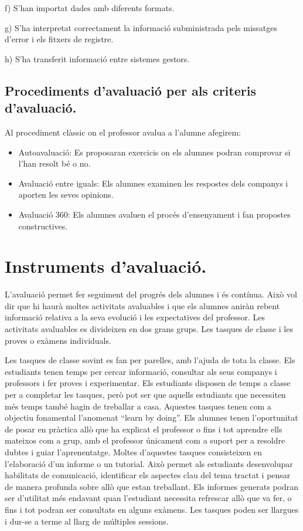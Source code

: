 \documentclass[catalan, a4paper, 12pt, titlepage]{article}
\begin{document}
f) S'han importat dades amb diferents formats.

g) S'ha interpretat correctament la informació subministrada pels missatges d'error i els fitxers de registre.

h) S'ha transferit informació entre sistemes gestors.

\subsection{Procediments d'avaluació per als criteris d'avaluació.}
\label{subsec:procediments}

Al procediment clàssic on el professor avalua a l'alumne afegirem:

\begin{itemize}
	\item Autoavaluació: Es proposaran exercicis on els alumnes podran comprovar si l'han resolt bé o no.
	\item Avaluació entre iguals: Els alumnes examinen les respostes dels companys i aporten les seves opinions.
	\item Avaluació 360: Els alumnes avaluen el procés d'ensenyament i fan propostes constructives.
\end{itemize}

\section{Instruments d'avaluació.}
\label{sec:instruments}

L'avaluació permet fer seguiment del progrés dels alumnes i és contínua.
Això vol dir que hi haurà moltes activitats avaluables i que els alumnes aniràn rebent informació relativa a la seva evolució i les expectatives del professor.
Les activitats avaluables es divideixen en dos grans grups. 
Les tasques de classe i les proves o exàmens individuals.

Les tasques de classe sovint es fan per parelles, amb l'ajuda de tota la classe.
Els estudiants tenen temps per cercar informació, consultar als seus companys i professors i fer proves i experimentar. 
Els estudiants disposen de temps a classe per a completar les tasques, però pot ser que aquells estudiants que necessiten més temps també hagin de treballar a casa.
Aquestes tasques tenen com a objectiu fonamental l'anomenat ``learn by doing''.
Els alumnes tenen l'oportunitat de posar en pràctica allò que ha explicat el professor o fins i tot aprendre ells mateixos com a grup, amb el professor únicament com a suport per a resoldre dubtes i guiar l'aprenentatge.
Moltes d'aquestes tasques consisteixen en l'elaboració d'un informe o un tutorial.
Això permet als estudiants desenvolupar habilitats de comunicació, identificar els aspectes clau del tema tractat i pensar de manera profunda sobre allò que estan treballant. Els informes generats podran ser d'utilitat més endavant quan l'estudiant necessita refrescar allò que va fer, o fins i tot podran ser consultats en alguns exàmens.
Les tasques poden ser llargues i dur-se a terme al llarg de múltiples sessions.
\end{document}
